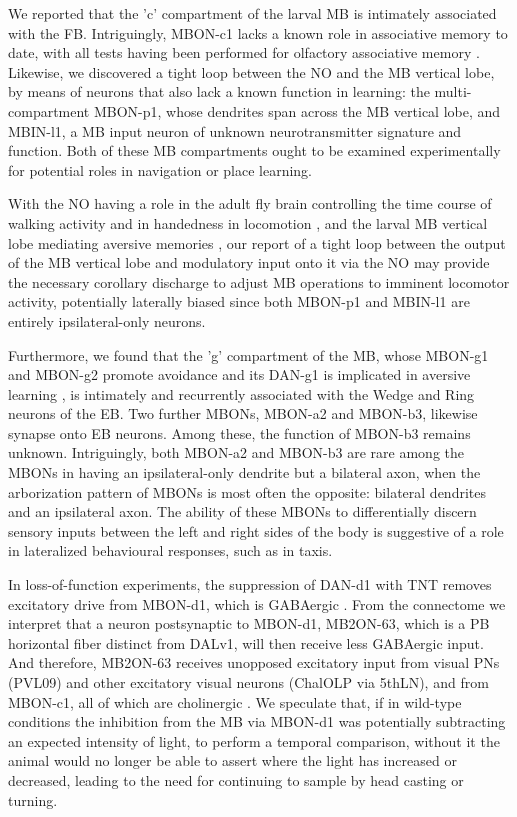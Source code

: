         We reported that the 'c' compartment of the larval MB is intimately associated with the FB. Intriguingly, MBON-c1 lacks a known role in associative memory to date, with all tests having been performed for olfactory associative memory \citep{eschbach2020recurrent}. Likewise, we discovered a tight loop between the NO and the MB vertical lobe, by means of neurons that also lack a known function in learning: the multi-compartment MBON-p1, whose dendrites span across the MB vertical lobe, and MBIN-l1, a MB input neuron of unknown neurotransmitter signature and function. Both of these MB compartments ought to be examined experimentally for potential roles in navigation or place learning.

        With the NO having a role in the adult fly brain controlling the time course of walking activity \citep{strauss1993higher} and in handedness in locomotion \citep{buchanan2015neuronal}, and the larval MB vertical lobe mediating aversive memories \citep{eschbach2020recurrent}, our report of a tight loop between the output of the MB vertical lobe and modulatory input onto it via the NO may provide the necessary corollary discharge to adjust MB operations to imminent locomotor activity, potentially laterally biased since both MBON-p1 and MBIN-l1 are entirely ipsilateral-only neurons.

        Furthermore, we found that the 'g' compartment of the MB, whose MBON-g1 and MBON-g2 promote avoidance \citep{eschbach2021circuits} and its DAN-g1 is implicated in aversive learning \citep{eschbach2020recurrent}, is intimately and recurrently associated with the Wedge and Ring neurons of the EB. Two further MBONs, MBON-a2 and MBON-b3, likewise synapse onto EB neurons. Among these, the function of MBON-b3 remains unknown. Intriguingly, both MBON-a2 and MBON-b3 are rare among the MBONs in having an ipsilateral-only dendrite but a bilateral axon, when the arborization pattern of MBONs is most often the opposite: bilateral dendrites and an ipsilateral axon. The ability of these MBONs to differentially discern sensory inputs between the left and right sides of the body is suggestive of a role in lateralized behavioural responses, such as in taxis.

        In loss-of-function experiments, the suppression of DAN-d1 with TNT removes excitatory drive from MBON-d1, which is GABAergic \citep{eschbach2021circuits}. From the connectome we interpret that a neuron postsynaptic to MBON-d1, MB2ON-63, which is a PB horizontal fiber distinct from DALv1, will then receive less GABAergic input. And therefore, MB2ON-63 receives unopposed excitatory input from visual PNs (PVL09) and other excitatory visual neurons (ChalOLP via 5thLN), and from MBON-c1, all of which are cholinergic \citep{larderet2017opticlobe, eschbach2021circuits}. We speculate that, if in wild-type conditions the inhibition from the MB via MBON-d1 was potentially subtracting an expected intensity of light, to perform a temporal comparison, without it the animal would no longer be able to assert where the light has increased or decreased, leading to the need for continuing to sample by head casting or turning.

